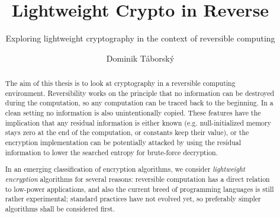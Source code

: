 \documentclass[a4paper,10pt,openright]{memoir}
\makeatletter
\newcommand{\verbatimfont}[1]{\def\verbatim@font{#1}}%
\makeatother
\begin{document}
\verbatimfont{\ttfamily\small}%

\thesiscomment{} %
\title{Lightweight Crypto in Reverse}
\subtitle{Exploring lightweight cryptography in the context of reversible computing}
\author{Dominik T\'{a}borsk\'{y}}

\pagestyle{plain}
\maketitle

\cleardoublepage
{}
\setcounter{page}{3}

\cleardoublepage
\pagestyle{plain}
\begin{abstract}

The aim of this thesis is to look at cryptography in a reversible 
computing environment. Reversibility works on the principle that no 
information can be destroyed during the computation, so any computation 
can be traced back to the beginning. In a clean setting no information 
is also unintentionally copied. These features have the implication 
that any residual information is either known (e.g. null-initialized 
memory stays zero at the end of the computation, or constants keep 
their value), or the encryption implementation can be potentially 
attacked by using the residual information to lower the searched 
entropy for brute-force decryption.

In an emerging classification of encryption algorithms, we 
consider \textit{lightweight encryption} algorithms for several 
reasons: reversible computation has a direct relation to low-power 
applications, and also the current breed of programming languages is 
still rather experimental; standard practices have not evolved yet, so 
preferably simpler algorithms shall be considered first.

\end{abstract}

\end{document}
